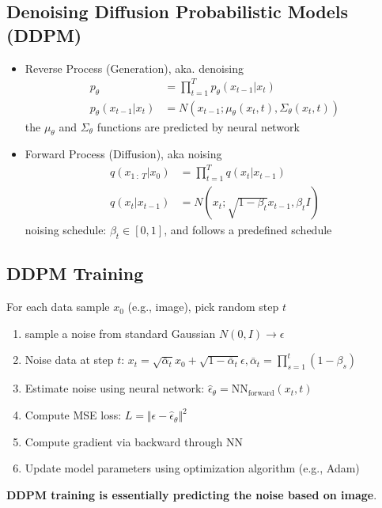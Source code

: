 \documentclass[10pt]{article}
\begin{document}
\subsection*{Denoising Diffusion Probabilistic Models (DDPM)}
\begin{itemize}
	\item Reverse Process (Generation), aka. denoising
	\begin{align*}
        p_\theta &= \prod_{t = 1}^T p_\theta (x_{t - 1} | x_t) \\
        p_\theta(x_{t - 1}|x_t) &= N(x_{t - 1}; \mu_\theta (x_t, t), \Sigma_\theta(x_t, t))
    \end{align*}
    the $\mu_\theta$ and $\Sigma_\theta$ functions are predicted by neural network
    \item Forward Process (Diffusion), aka noising
    \begin{align*}
        q(x_{1 \::\: T} | x_0) &= \prod_{t = 1}^T q(x_t | x_{t - 1}) \\
        q(x_t | x_{t - 1}) &= N(x_t; \sqrt{1 - \beta_t} x_{t - 1}, \beta_t I)
    \end{align*}
    noising schedule: $\beta_t \in [0, 1]$, and follows a predefined schedule
\end{itemize}

\subsection*{DDPM Training}
For each data sample $x_0$ (e.g., image), pick random step $t$
\begin{enumerate}
	\item sample a noise from standard Gaussian $N(0, I) \rightarrow \epsilon$
	\item Noise data at step $t$: $x_t = \sqrt{\bar{\alpha}_t} x_0 + \sqrt{1 - \bar{\alpha}_t} \epsilon, \bar{\alpha}_t = \prod_{s = 1}^t (1 - \beta_s)$
	\item Estimate noise using neural network: $\hat{\epsilon}_\theta = \text{NN}_{\text{forward}}(x_t, t)$
	\item Compute MSE loss: $L = \Vert \epsilon - \hat{\epsilon}_\theta\Vert^2$
	\item Compute gradient via backward through NN
	\item Update model parameters using optimization algorithm (e.g., Adam)
\end{enumerate}
\textbf{DDPM training is essentially predicting the noise based on image}.
\end{document}
